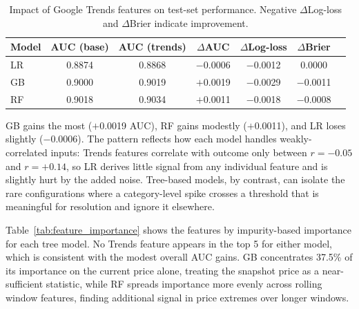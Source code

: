 \documentclass[11pt,twocolumn]{article}
\begin{document}
  \begin{table}[h]
  \centering
  \footnotesize
  \setlength{\tabcolsep}{3pt}
  \begin{tabular}{lcccccc}
  \toprule
  Model & AUC (base) & AUC (trends) & $\Delta$AUC & $\Delta$Log-loss & $\Delta$Brier \\
  \midrule
  LR & 0.8874 & 0.8868 & $-$0.0006 & $-$0.0012 & 0.0000  \\
  GB & 0.9000 & 0.9019 & $+$0.0019 & $-$0.0029 & $-$0.0011 \\
  RF & 0.9018 & 0.9034 & $+$0.0011 & $-$0.0018 & $-$0.0008 \\
  \bottomrule
  \end{tabular}
  \caption{Impact of Google Trends features on test-set performance.
  Negative $\Delta$Log-loss and $\Delta$Brier indicate improvement.}
  \label{tab:trends_delta}
  \end{table}

  GB gains the most ($+$0.0019 AUC), RF gains modestly ($+$0.0011),
  and LR loses slightly ($-$0.0006). The pattern reflects how each
  model handles weakly-correlated inputs: Trends features correlate
  with outcome only between $r = -0.05$ and $r = +0.14$, so LR
  derives little signal from any individual feature and is slightly
  hurt by the added noise. Tree-based models, by contrast, can isolate
  the rare configurations where a category-level spike crosses a
  threshold that is meaningful for resolution and ignore it elsewhere.

  Table~\ref{tab:feature_importance} shows the features by impurity-based importance for each tree model. No Trends feature appears in the top
  5 for either model, which is consistent with the modest overall AUC
  gains. GB concentrates 37.5\% of its importance on the current price
  alone, treating the snapshot price as a near-sufficient statistic,
  while RF spreads importance more evenly across rolling window
  features, finding additional signal in price extremes over longer
  windows.
\end{document}
